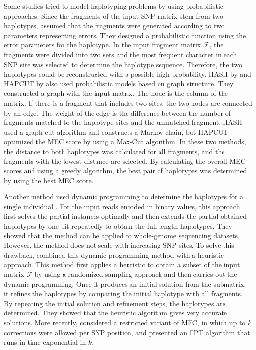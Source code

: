 Some studies tried to model haplotyping problems by using probabilistic approaches. 
Since the fragments of the input SNP matrix stem from two haplotypes, 
\cite{chen2008linear} assumed that the fragments were generated according to two parameters representing errors. 
They designed a probabilistic function using the error parameters for the haplotype. 
In the input fragment matrix $\mathcal{F}$, the fragments were divided into two sets and the most frequent character 
in each SNP site was selected to determine the haplotype sequence. 
Therefore, the two haplotypes could be reconstructed with a possible high probability. 
HASH by \cite{bansal2008mcmc} and HAPCUT by \cite{Bansal2008} also used probabilistic models based on graph structure. 
They constructed a graph with the input matrix. The node is the column of the matrix. 
If there is a fragment that includes two sites, the two nodes are connected by an edge. 
The weight of the edge is the difference between the number of fragments matched to the haplotype sites and the unmatched fragment. 
HASH used a graph-cut algorithm and constructs a Markov chain, 
but HAPCUT optimized the MEC score by using a Max-Cut algorithm. 
In these two methods, the distance to both haplotypes was calculated for all fragments, and the fragments with the lowest distance are selected. 
By calculating the overall MEC scores and using a greedy algorithm, the best pair of haplotypes was determined by using the best MEC score.

Another method used dynamic programming to determine the haplotypes for a single individual \citep{he2010optimal}. 
For the input reads encoded in binary values, this approach first solves the partial instances optimally and then extends the partial obtained haplotypes by one bit repeatedly to obtain the full-length haplotypes. 
They showed that the method can be applied to whole-genome sequencing datasets. However, the method does not scale with increasing SNP sites.
To solve this drawback, \cite{deng2013highly} combined this dynamic programming method with a heuristic approach. 
This method first applies a heuristic to obtain a subset of the input matrix $\mathcal{F}$ by using a randomized sampling approach and then carries out the dynamic programming. 
Once it produces an initial solution from the submatrix, it refines the haplotypes by comparing the initial haplotype with all fragments. 
By repeating the initial solution and refinement steps, the haplotypes are determined.
They showed that the heuristic algorithm gives very accurate solutions.
More recently, \cite{Pirola2015} considered a restricted variant of MEC, in which up to $k$ corrections were allowed per SNP position, 
and presented an FPT algorithm that runs in time exponential in $k$.

